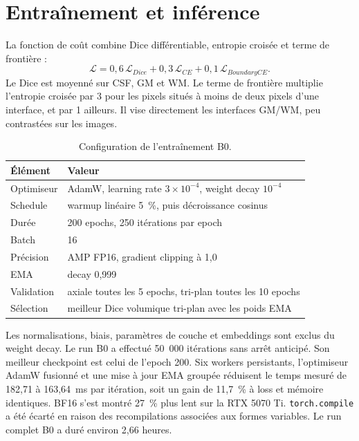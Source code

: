 \documentclass[11pt,a4paper]{article}
\begin{document}
\section{Entraînement et inférence}

La fonction de coût combine Dice différentiable, entropie croisée et terme de
frontière :
\begin{equation}
  \mathcal{L}=0{,}6\,\mathcal{L}_{Dice}
  +0{,}3\,\mathcal{L}_{CE}
  +0{,}1\,\mathcal{L}_{BoundaryCE}.
\end{equation}
Le Dice est moyenné sur CSF, GM et WM. Le terme de frontière multiplie
l'entropie croisée par 3 pour les pixels situés à moins de deux pixels d'une
interface, et par 1 ailleurs. Il vise directement les interfaces GM/WM, peu
contrastées sur les images.

\begin{table}[htbp]
\centering
\small
\caption{Configuration de l'entraînement B0.}
\label{tab:training}
\begin{tabular}{@{}ll@{}}
\toprule
Élément & Valeur \\
\midrule
Optimiseur & AdamW, learning rate $3\times10^{-4}$, weight decay $10^{-4}$ \\
Schedule & warmup linéaire 5~\%, puis décroissance cosinus \\
Durée & 200 epochs, 250 itérations par epoch \\
Batch & 16 \\
Précision & AMP FP16, gradient clipping à 1,0 \\
EMA & decay 0,999 \\
Validation & axiale toutes les 5 epochs, tri-plan toutes les 10 epochs \\
Sélection & meilleur Dice volumique tri-plan avec les poids EMA \\
\bottomrule
\end{tabular}
\end{table}

Les normalisations, biais, paramètres de couche et embeddings sont exclus du
weight decay. Le run B0 a effectué 50~000 itérations sans arrêt anticipé. Son
meilleur checkpoint est celui de l'epoch 200. Six workers persistants,
l'optimiseur AdamW fusionné et une mise à jour EMA groupée réduisent le temps
mesuré de 182,71 à 163,64~ms par itération, soit un gain de 11,7~\% à loss et
mémoire identiques. BF16 s'est montré 27~\% plus lent sur la RTX 5070 Ti.
\texttt{torch.compile} a été écarté en raison des recompilations associées aux
formes variables. Le run complet B0 a duré environ 2,66 heures.
\end{document}
